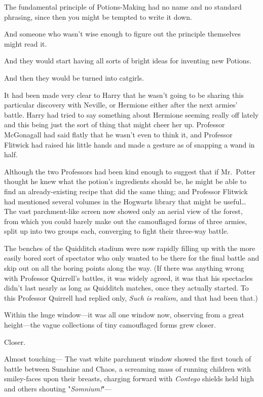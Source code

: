 The fundamental principle of Potions-Making had no name and no standard 
phrasing, since then you might be tempted to write it down.

And someone who wasn't wise enough to figure out the principle themselves might 
read it.

And they would start having all sorts of bright ideas for inventing new Potions.

And then they would be turned into catgirls.

It had been made very clear to Harry that he wasn't going to be sharing this 
particular discovery with Neville, or Hermione either after the next armies' 
battle. Harry had tried to say something about Hermione seeming really off 
lately and this being just the sort of thing that might cheer her up. Professor 
McGonagall had said flatly that he wasn't even to think it, and Professor 
Flitwick had raised his little hands and made a gesture as of snapping a wand 
in half.

Although the two Professors had been kind enough to suggest that if Mr.~Potter 
thought he knew what the potion's ingredients should be, he might be able to 
find an already-existing recipe that did the same thing; and Professor Flitwick 
had mentioned several volumes in the Hogwarts library that might be 
useful{\ldots}
\sbreak
The vast parchment-like screen now showed only an aerial view of the forest, 
from which you could barely make out the camouflaged forms of three armies, 
split up into two groups each, converging to fight their three-way battle.

The benches of the Quidditch stadium were now rapidly filling up with the more 
easily bored sort of spectator who only wanted to be there for the final battle 
and skip out on all the boring points along the way. (If there was anything 
wrong with Professor Quirrell's battles, it was widely agreed, it was that his 
spectacles didn't last nearly as long as Quidditch matches, once they actually 
started. To this Professor Quirrell had replied only, \emph{Such is realism,} 
and that had been that.)

Within the huge window---it was all one window now, observing from a great 
height---the vague collections of tiny camouflaged forms grew closer.

Closer.

Almost touching---
\sbreak
The vast white parchment window showed the first touch of battle between 
Sunshine and Chaos, a screaming mass of running children with smiley-faces upon 
their breasts, charging forward with \emph{Contego} shields held high and 
others shouting "\emph{Somnium!}"---


